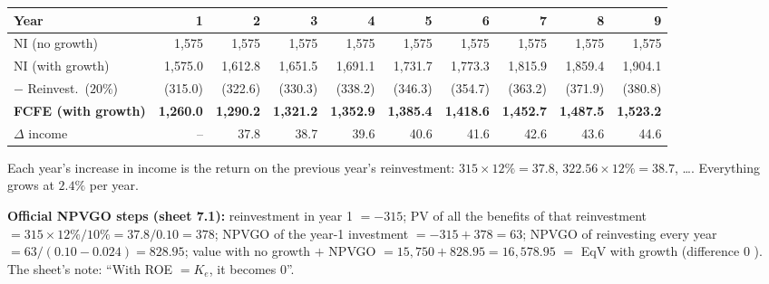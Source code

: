 \begin{exbox}[Official sheet 7.1: the year-by-year path (ERR $=20\%$, ROE $=12\%$, $g=2.4\%$)]
\begin{center}
\scriptsize\setlength{\tabcolsep}{3pt}
\begin{tabular}{@{}lrrrrrrrrr@{}}
\toprule
Year & 1 & 2 & 3 & 4 & 5 & 6 & 7 & 8 & 9\\
\midrule
NI (no growth) & 1,575 & 1,575 & 1,575 & 1,575 & 1,575 & 1,575 & 1,575 & 1,575 & 1,575\\
NI (with growth) & 1,575.0 & 1,612.8 & 1,651.5 & 1,691.1 & 1,731.7 & 1,773.3 & 1,815.9 & 1,859.4 & 1,904.1\\
$-$ Reinvest.\ ($20\%$) & (315.0) & (322.6) & (330.3) & (338.2) & (346.3) & (354.7) & (363.2) & (371.9) & (380.8)\\
\textbf{FCFE (with growth)} & \textbf{1,260.0} & \textbf{1,290.2} & \textbf{1,321.2} & \textbf{1,352.9} & \textbf{1,385.4} & \textbf{1,418.6} & \textbf{1,452.7} & \textbf{1,487.5} & \textbf{1,523.2}\\
$\Delta$ income & -- & 37.8 & 38.7 & 39.6 & 40.6 & 41.6 & 42.6 & 43.6 & 44.6\\
\bottomrule
\end{tabular}
\end{center}
Each year's increase in income is the return on the previous year's reinvestment: $315\times12\%=37.8$, $322.56\times12\%=38.7$, \dots. Everything grows at $2.4\%$ per year.

\smallskip
\textbf{Official NPVGO steps (sheet 7.1):} reinvestment in year 1 $=-315$; PV of all the benefits of that reinvestment $=315\times12\%/10\%=37.8/0.10=378$; NPVGO of the year-1 investment $=-315+378=63$; NPVGO of reinvesting every year $=63/(0.10-0.024)=828.95$; value with no growth $+$ NPVGO $=15{,}750+828.95=16{,}578.95$ $=$ EqV with growth (difference 0 \checkmark). The sheet's note: ``With ROE $=K_e$, it becomes 0''.
\end{exbox}


